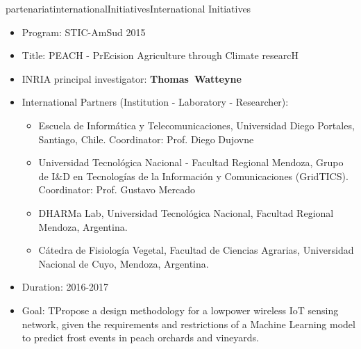 \documentclass{ra2016}
\newcommand{\thomas}           {\textbf{Thomas~Watteyne}}
\begin{document}
\begin{module}{partenariat}{internationalInitiatives}{International Initiatives}
\begin{itemize}
    \item Program: STIC-AmSud 2015
    \item Title: PEACH - PrEcision Agriculture through Climate researcH
    \item INRIA principal investigator: \thomas
    \item International Partners (Institution -  Laboratory - Researcher):
        \begin{itemize}
            \item Escuela de Inform\'atica y Telecomunicaciones, Universidad Diego Portales, Santiago, Chile. Coordinator: Prof. Diego Dujovne
            \item Universidad Tecnol\'ogica Nacional - Facultad Regional Mendoza, Grupo de I\&D en Tecnologías de la Información y Comunicaciones (GridTICS). Coordinator: Prof. Gustavo Mercado
            \item DHARMa Lab, Universidad Tecnol\'ogica Nacional, Facultad Regional Mendoza, Argentina.
            \item C\'atedra de Fisiolog\'ia Vegetal, Facultad de Ciencias Agrarias, Universidad Nacional de Cuyo, Mendoza, Argentina.
        \end{itemize}
    \item Duration: 2016-2017
    \item Goal: TPropose a design methodology for a low­power wireless IoT sensing network, given the requirements and restrictions of a Machine Learning model to predict frost events in peach orchards and vineyards.
\end{itemize}


\end{module}
\end{document}
